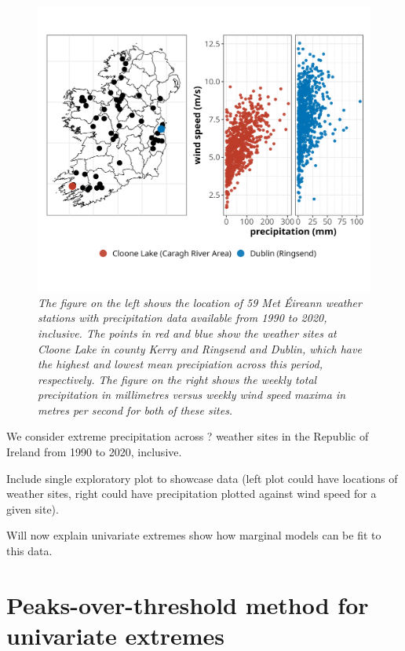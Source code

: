 \documentclass{article}
\numberwithin{equation}{section}
\begin{document}
\begin{figure}[H]
    \centering
    \includegraphics[width = 0.9\linewidth]{plots/02_mot_ex_plot.png}
    \caption{\emph{The figure on the left shows the location of 59 Met Éireann weather stations with precipitation data available from 1990 to 2020, inclusive. The points in red and blue show the weather sites at Cloone Lake in county Kerry and Ringsend and Dublin, which have the highest and lowest mean precipiation across this period, respectively. The figure on the right shows the weekly total precipitation in millimetres versus weekly wind speed maxima in metres per second for both of these sites.}}
    \label{fig:02_locs}
\end{figure}

We consider extreme precipitation across ? weather sites in the Republic of Ireland from 1990 to 2020, inclusive.  


Include single exploratory plot to showcase data (left plot could have locations of weather sites, right could have precipitation plotted against wind speed for a given site).

Will now explain univariate extremes show how marginal models can be fit to this data.

\newpage
\section{Peaks-over-threshold method for univariate extremes}\label{sec:uni}
\end{document}
